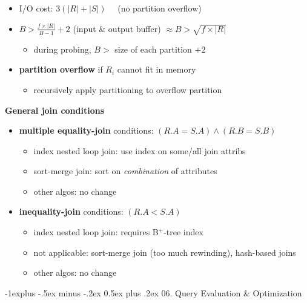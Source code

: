 \documentclass[8pt, landscape]{extarticle}
\makeatletter
\renewcommand{\subsection}{\@startsection{subsection}{2}{0mm}%
  {-1explus -.5ex minus -.2ex}%
  {0.5ex plus .2ex}%
{\normalfont\normalsize\bfseries}}
\makeatother
\begin{document}
\begin{multicols*}{4}
  \begin{itemize}
    \item I/O cost: $3(|R|+|S|) \quad$ (no partition overflow)
    \item $B > \frac{f \times |R|}{B-1} + 2$ (input \& output buffer) $\approx B > \sqrt{f\times |R|}$
      \begin{itemize}
        \item during probing, $B >$ size of each partition $+ 2$
      \end{itemize}
    \item \textbf{partition overflow} if $R_i$ cannot fit in memory
      \begin{itemize}
        \item recursively apply partitioning to overflow partition
      \end{itemize}
  \end{itemize}

  \textbf{General join conditions}

  \begin{itemize}
    \item \textbf{multiple equality-join} conditions: $(R.A = S.A) \land (R.B=S.B)$
      \begin{itemize}
        \item index nested loop join: use index on some/all join attribs
        \item sort-merge join: sort on \textit{combination} of attributes
        \item other algos: no change
      \end{itemize}
    \item \textbf{inequality-join} conditions: $(R.A<S.A)$
      \begin{itemize}
        \item index nested loop join: requires B$^+$-tree index
        \item not applicable: sort-merge join (too much rewinding), hash-based joins
        \item other algos: no change
      \end{itemize}
  \end{itemize}

  \subsection{06. Query Evaluation \& Optimization}


\end{multicols*}
\end{document}
